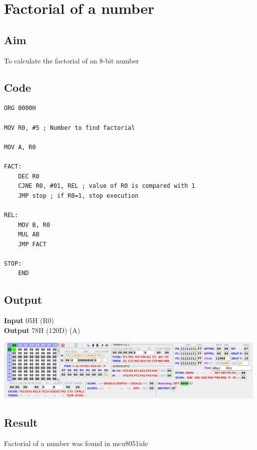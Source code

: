 \section{Factorial of a number}
\subsection{Aim}
To calculate the factorial of an 8-bit number

\subsection{Code}
\begin{lstlisting}
ORG 0000H

MOV R0, #5 ; Number to find factorial

MOV A, R0

FACT:
    DEC R0
    CJNE R0, #01, REL ; value of R0 is compared with 1
    JMP stop ; if R0=1, stop execution

REL:
    MOV B, R0
    MUL AB
    JMP FACT

STOP:
    END
\end{lstlisting}

\subsection{Output}
\textbf{Input} 05H (R0)\\
\textbf{Output} 78H (120D) (A)\\
\begin{center}
	\includegraphics[width=\textwidth]{img/p27.png}
\end{center}


\subsection{Result}
Factorial of a number was found in mcu8051ide